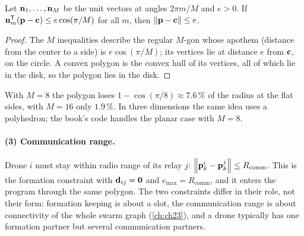 \begin{proposition}
\label{thm:ch21-polygon}
Let $\mathbf{n}_1,\dots,\mathbf{n}_M$ be the unit vectors at angles $2\pi m/M$ and
$e>0$. If $\mathbf{n}_m^{\mathsf{T}}(\mathbf{p}-\mathbf{c})\le e\cos(\pi/M)$ for all $m$, then
$\left\lVert \mathbf{p}-\mathbf{c} \right\rVert\le e$.
\end{proposition}
\begin{proof}
The $M$ inequalities describe the regular $M$-gon whose apothem (distance from
the center to a side) is $e\cos(\pi/M)$; its vertices lie at distance $e$ from
$\mathbf{c}$, on the circle. A convex polygon is the convex hull of its
vertices, all of which lie in the disk, so the polygon lies in the disk. \qedhere
\end{proof}

With $M=8$ the polygon loses $1-\cos(\pi/8)\approx7.6\,\%$ of the radius at the
flat sides, with $M=16$ only $1.9\,\%$. In three dimensions the same idea uses
a polyhedron; the book's code handles the planar case with $M=8$.

\paragraph{(3) Communication range.}
Drone $i$ must stay within radio range of its relay $j$:
$\left\lVert \mathbf{p}_k^{i}-\mathbf{p}_k^{j} \right\rVert\le R_{\mathrm{comm}}$. This is the formation
constraint with $\mathbf{d}_{ij}=\mathbf{0}$ and $e_{\max}=R_{\mathrm{comm}}$, and it
enters the program through the same polygon. The two constraints differ in
their role, not their form: formation keeping is about a slot, the
communication range is about connectivity of the whole swarm graph
(\cref{ch:ch23}), and a drone typically has one formation partner but several
communication partners.

